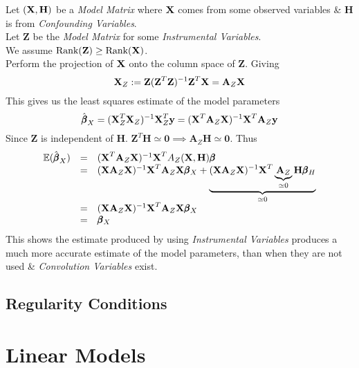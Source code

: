 \documentclass[11pt,a4paper]{article}
\begin{document}
Let $(\textbf{X},\textbf{H})$ be a \textit{Model Matrix} where $\textbf{X}$ comes from some observed variables \& $\textbf{H}$ is from \textit{Confounding Variables}.\\
Let $\textbf{Z}$ be the \textit{Model Matrix} for some \textit{Instrumental Variables}.\\
We assume $\text{Rank}(\textbf{Z})\geq\text{Rank}(\textbf{X})$.\\
Perform the projection of $\textbf{X}$ onto the column space of $\textbf{Z}$. Giving
$$\textbf{X}_Z:=\textbf{Z}(\textbf{Z}^T\textbf{Z})^{-1}\textbf{Z}^T\textbf{X}=\textbf{A}_Z\textbf{X}$$
This gives us the least squares estimate of the model parameters
$$\hat{\pmb\beta}_X=(\textbf{X}_Z^T\textbf{X}_Z)^{-1}\textbf{X}_Z^T\textbf{y}=(\textbf{X}^T\textbf{A}_Z\textbf{X})^{-1}\textbf{X}^T\textbf{A}_Z\textbf{y}$$
Since $\textbf{Z}$ is independent of $\textbf{H}$. $\textbf{Z}^T\textbf{H}\simeq\pmb0\implies\textbf{A}_Z\textbf{H}\simeq\pmb0$. Thus
\[\begin{array}{rcl}
\mathbb{E}(\hat{\pmb\beta}_X)&=&(\textbf{X}^T\textbf{A}_Z\textbf{X})^{-1}\textbf{X}^TA_Z(\textbf{X},\textbf{H})\pmb\beta\\
&=&(\textbf{X}\textbf{A}_Z\textbf{X})^{-1}\textbf{X}^T\textbf{A}_Z\textbf{X}\pmb\beta_X+\underbrace{(\textbf{X}\textbf{A}_Z\textbf{X})^{-1}\textbf{X}^T\underbrace{\textbf{A}_Z}_{\simeq0}\textbf{H}\pmb\beta_H}_{\simeq0}\\
&=&(\textbf{X}\textbf{A}_Z\textbf{X})^{-1}\textbf{X}^T\textbf{A}_Z\textbf{X}\pmb\beta_X\\
&=&\pmb\beta_X
\end{array}\]
This shows the estimate produced by using \textit{Instrumental Variables} produces a much more accurate estimate of the model parameters, than when they are not used \& \textit{Convolution Variables} exist.

\subsection{Regularity Conditions}

\section{Linear Models}
\end{document}
